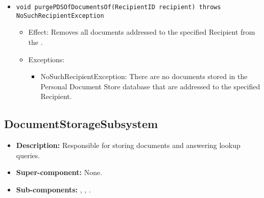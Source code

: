 \begin{itemize}
\begin{itemize}
		\item \texttt{void purgePDSOfDocumentsOf(RecipientID recipient) throws NoSuchRecipientException}
		\begin{itemize}
			\item Effect: Removes all documents addressed to the specified Recipient from the .
			\item Exceptions:
			\begin{itemize}
				\item NoSuchRecipientException: There are no documents stored in the Personal Document Store database that are addressed to the specified Recipient.
			\end{itemize}
		\end{itemize}
	\end{itemize}
\end{itemize}

\subsection{DocumentStorageSubsystem}
\begin{itemize}
	\item \textbf{Description:} Responsible for storing documents and answering lookup queries.
	\item \textbf{Super-component:} None.
	\item \textbf{Sub-components:} , , .
\end{itemize}

